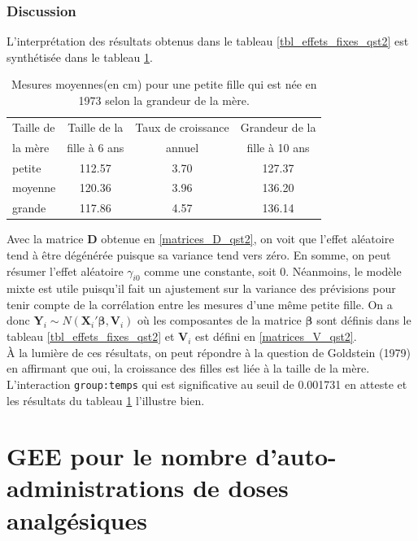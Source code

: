 \documentclass{article}
\begin{document}
	\subsubsection*{Discussion}
		L'interprétation des résultats obtenus dans le tableau \ref{tbl_effets_fixes_qst2} est synthétisée dans le tableau \ref{tbl_interpretation_qst2}.
		\begin{table}[H]
			\centering
			\begin{tabular}{lccc}
				\hline
				Taille de  & Taille de la  & Taux de croissance  &  Grandeur de la \\
				la mère & fille à 6 ans & annuel &  fille à 10 ans \\
				\hline
				petite & 112.57 & 3.70 & 127.37 \\
				moyenne & 120.36 & 3.96 & 136.20 \\
				grande & 117.86 & 4.57 & 136.14 \\
				\hline
			\end{tabular}
			\caption{Mesures moyennes(en cm) pour une petite fille qui est née en 1973 selon la grandeur de la mère.}
			\label{tbl_interpretation_qst2}
		\end{table}
		Avec la matrice $\boldsymbol{D}$ obtenue en \eqref{matrices_D_qst2}, on voit que l'effet aléatoire tend à être dégénérée puisque sa variance tend vers zéro. En somme, on peut résumer l'effet aléatoire $\gamma_{i0}$ comme une constante, soit 0. Néanmoins, le modèle mixte est utile puisqu'il fait un ajustement sur la variance des prévisions pour tenir compte de la corrélation entre les mesures d'une même petite fille.
		On a donc $\boldsymbol{Y}_{i} \sim N(\boldsymbol{X}_{i}'\boldsymbol{\beta}, \boldsymbol{V}_i)$ où les composantes de la matrice $\boldsymbol{\beta}$ sont définis dans le tableau \ref{tbl_effets_fixes_qst2} et $\boldsymbol{V}_i$ est défini en \eqref{matrices_V_qst2}.\\
		
		À la lumière de ces résultats, on peut répondre à la question de Goldstein (1979) en affirmant que oui, la croissance des filles est liée à la taille de la mère.
		L'interaction \texttt{group:temps} qui est significative au seuil de 0.001731 en atteste et les résultats du tableau \ref{tbl_interpretation_qst2} l'illustre bien.
		

\section{GEE pour le nombre d'auto-administrations de doses analgésiques}
\end{document}
